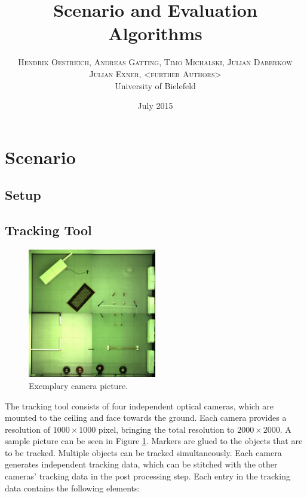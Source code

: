 \documentclass[twoside]{article}
\title{\vspace{-15mm}\fontsize{24pt}{10pt}\selectfont\textbf{Scenario and Evaluation Algorithms}} %
\author{
\large
\textsc{Hendrik Oestreich, Andreas Gatting, Timo Michalski, Julian Daberkow}\\
\textsc{Julian Exner, <further Authors>}\\%
\normalsize University of Bielefeld \\ %
}
\date{July 2015}
\begin{document}
\maketitle %

\thispagestyle{fancy} %




\section{Scenario}
\subsection{Setup} %
\subsection{Tracking Tool} %

\begin{figure} 
	\begin{centering}
		\includegraphics[width=0.5\textwidth]{setup.jpg}
		\caption{Exemplary camera picture.}
		\label{fig:setup}
	\end{centering}
\end{figure}
The tracking tool consists of four independent optical cameras, which are mounted to the ceiling and face towards the ground. Each camera provides a resolution of $1000 \times 1000$ pixel, bringing the total resolution to $2000 \times 2000$. A sample picture can be seen in Figure \ref{fig:setup}. Markers are glued to the objects that are to be tracked. Multiple objects can be tracked simultaneously. Each camera generates independent tracking data, which can be stitched with the other cameras' tracking data in the post processing step. Each entry in the tracking data contains the following elements:
\end{document}
